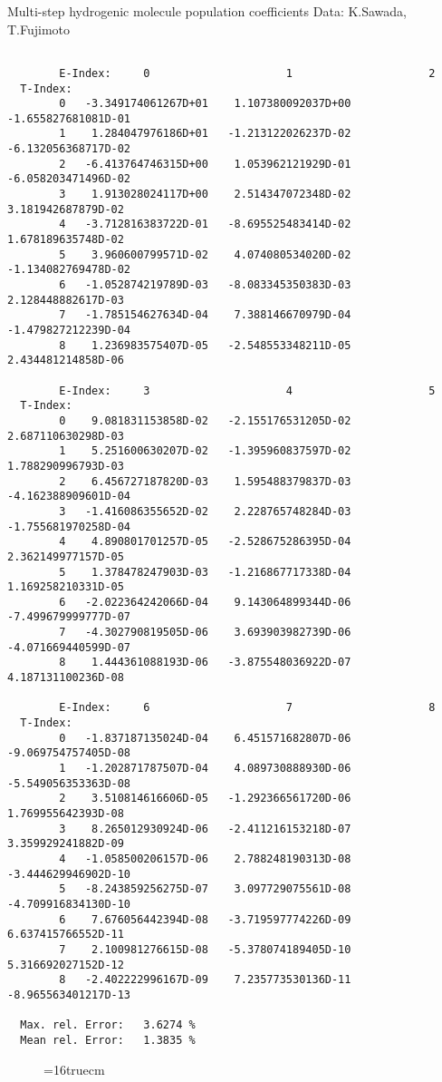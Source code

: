 \documentclass[12pt]{article}
\begin{document}
 Multi-step hydrogenic molecule population coefficients
 Data: K.Sawada, T.Fujimoto
\begin{small}\begin{verbatim}

        E-Index:     0                     1                     2
  T-Index:
        0   -3.349174061267D+01    1.107380092037D+00   -1.655827681081D-01
        1    1.284047976186D+01   -1.213122026237D-02   -6.132056368717D-02
        2   -6.413764746315D+00    1.053962121929D-01   -6.058203471496D-02
        3    1.913028024117D+00    2.514347072348D-02    3.181942687879D-02
        4   -3.712816383722D-01   -8.695525483414D-02    1.678189635748D-02
        5    3.960600799571D-02    4.074080534020D-02   -1.134082769478D-02
        6   -1.052874219789D-03   -8.083345350383D-03    2.128448882617D-03
        7   -1.785154627634D-04    7.388146670979D-04   -1.479827212239D-04
        8    1.236983575407D-05   -2.548553348211D-05    2.434481214858D-06

        E-Index:     3                     4                     5
  T-Index:
        0    9.081831153858D-02   -2.155176531205D-02    2.687110630298D-03
        1    5.251600630207D-02   -1.395960837597D-02    1.788290996793D-03
        2    6.456727187820D-03    1.595488379837D-03   -4.162388909601D-04
        3   -1.416086355652D-02    2.228765748284D-03   -1.755681970258D-04
        4    4.890801701257D-05   -2.528675286395D-04    2.362149977157D-05
        5    1.378478247903D-03   -1.216867717338D-04    1.169258210331D-05
        6   -2.022364242066D-04    9.143064899344D-06   -7.499679999777D-07
        7   -4.302790819505D-06    3.693903982739D-06   -4.071669440599D-07
        8    1.444361088193D-06   -3.875548036922D-07    4.187131100236D-08

        E-Index:     6                     7                     8
  T-Index:
        0   -1.837187135024D-04    6.451571682807D-06   -9.069754757405D-08
        1   -1.202871787507D-04    4.089730888930D-06   -5.549056353363D-08
        2    3.510814616606D-05   -1.292366561720D-06    1.769955642393D-08
        3    8.265012930924D-06   -2.411216153218D-07    3.359929241882D-09
        4   -1.058500206157D-06    2.788248190313D-08   -3.444629946902D-10
        5   -8.243859256275D-07    3.097729075561D-08   -4.709916834130D-10
        6    7.676056442394D-08   -3.719597774226D-09    6.637415766552D-11
        7    2.100981276615D-08   -5.378074189405D-10    5.316692027152D-12
        8   -2.402222996167D-09    7.235773530136D-11   -8.965563401217D-13

  Max. rel. Error:   3.6274 %
  Mean rel. Error:   1.3835 %

\end{verbatim}\end{small}
\begin{figure} \label{2.2.5fu}
\epsfxsize=16truecm
\end{figure}
\end{document}
